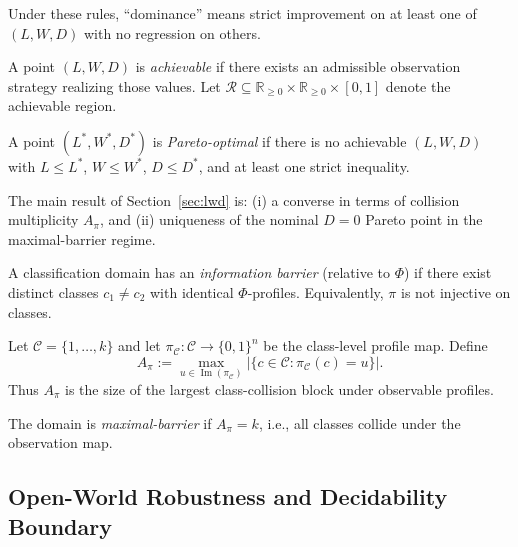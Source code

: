 Under these rules, ``dominance'' means strict improvement on at least one of $(L, W, D)$ with no regression on others.

\begin{definition}
A point $(L, W, D)$ is \emph{achievable} if there exists an admissible observation strategy realizing those values. Let $\mathcal{R} \subseteq \mathbb{R}_{\geq 0} \times \mathbb{R}_{\geq 0} \times [0,1]$ denote the achievable region.
\end{definition}

\begin{definition}
A point $(L^*, W^*, D^*)$ is \emph{Pareto-optimal} if there is no achievable $(L, W, D)$ with $L \leq L^*$, $W \leq W^*$, $D \leq D^*$, and at least one strict inequality.
\end{definition}

The main result of Section~\ref{sec:lwd} is: (i) a converse in terms of collision multiplicity $A_\pi$, and (ii) uniqueness of the nominal $D=0$ Pareto point in the maximal-barrier regime.

\begin{definition}
\label{def:info-barrier-domain}
A classification domain has an \emph{information barrier} (relative to $\Phi$) if there exist distinct classes $c_1 \neq c_2$ with identical $\Phi$-profiles. Equivalently, $\pi$ is not injective on classes.
\end{definition}

\begin{definition}
\label{def:collision-multiplicity}
Let $\mathcal{C}=\{1,\ldots,k\}$ and let $\pi_{\mathcal{C}}:\mathcal{C}\to\{0,1\}^n$ be the class-level profile map. Define
\[
A_\pi := \max_{u \in \operatorname{Im}(\pi_{\mathcal{C}})} \left|\{c \in \mathcal{C} : \pi_{\mathcal{C}}(c)=u\}\right|.
\]
Thus $A_\pi$ is the size of the largest class-collision block under observable profiles.
\end{definition}

\begin{definition}
\label{def:max-barrier}
The domain is \emph{maximal-barrier} if $A_\pi = k$, i.e., all classes collide under the observation map.
\end{definition}

\subsection{Open-World Robustness and Decidability Boundary}\label{sec:open-world-boundary}

